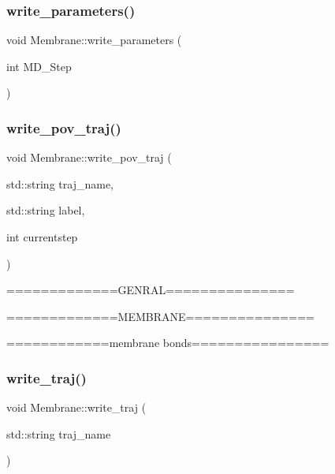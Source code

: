 \subsubsection{\texorpdfstring{write\_parameters()}{write\_parameters()}}
{\footnotesize\ttfamily void Membrane\+::write\+\_\+parameters (\begin{DoxyParamCaption}\item[{int}]{M\+D\+\_\+\+Step }\end{DoxyParamCaption})}

\mbox{\label{classMembrane_a4b2c1a070787e45652d2055311b9685d}} 
\subsubsection{\texorpdfstring{write\_pov\_traj()}{write\_pov\_traj()}}
{\footnotesize\ttfamily void Membrane\+::write\+\_\+pov\+\_\+traj (\begin{DoxyParamCaption}\item[{std\+::string}]{traj\+\_\+name,  }\item[{std\+::string}]{label,  }\item[{int}]{currentstep }\end{DoxyParamCaption})}

=============G\+E\+N\+R\+AL===============

=============M\+E\+M\+B\+R\+A\+NE===============

============membrane bonds================ \mbox{\label{classMembrane_a74ebace0e97952e966f1fe3babf420a7}} 
\subsubsection{\texorpdfstring{write\_traj()}{write\_traj()}\hspace{0.1cm}{\footnotesize\ttfamily [1/2]}}
{\footnotesize\ttfamily void Membrane\+::write\+\_\+traj (\begin{DoxyParamCaption}\item[{std\+::string}]{traj\+\_\+name }\end{DoxyParamCaption})}

\mbox{\label{classMembrane_ace8dd26e72369937db74fadcab2726aa}} 
